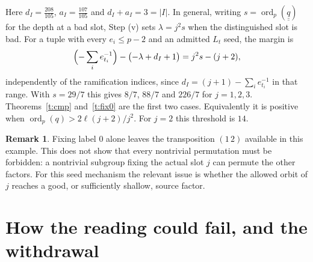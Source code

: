 \documentclass[11pt]{article}
\theoremstyle{plain}
\theoremstyle{definition}
\newtheorem{remark}{Remark}
\newcommand{\ord}{\operatorname{ord}}
\begin{document}
Here $d_I=\tfrac{208}{105}$, $a_I=\tfrac{107}{105}$ and $d_I+a_I=3=|I|$.  In
general, writing $s=\ord_p(\underline{\underline q})$ for the depth at a bad slot,
Step (v) sets $\lambda=j^2s$ when the distinguished slot is bad.  For a tuple
with every $e_i\le p-2$ and an admitted $L_t$ seed, the margin is
\[
 \Bigl(-\sum_i e_{t_i}^{-1}\Bigr)-\bigl(-\lambda+d_I+1\bigr)=j^2s-(j+2),
\]
independently of the ramification indices, since $d_I=(j+1)-\sum_ie_{t_i}^{-1}$
in that range.  With $s=29/7$ this gives $8/7$, $88/7$ and $226/7$ for
$j=1,2,3$.  Theorems~\ref{t:cmp} and~\ref{t:fix0} are the first two cases.
Equivalently it is positive when
$\ord_p(q)>2\ell(j+2)/j^2$.  For $j=2$ this threshold is $14$.

\begin{remark}
Fixing label $0$ alone leaves the transposition $(1\,2)$ available in this
example.  This does not show that every nontrivial permutation must be
forbidden: a nontrivial subgroup fixing the actual slot $j$ can permute the
other factors.  For this seed mechanism the relevant issue is whether the
allowed orbit of $j$ reaches a good, or sufficiently shallow, source factor.
\end{remark}

\section{How the reading could fail, and the withdrawal}\label{s:fals}
\end{document}
